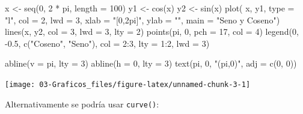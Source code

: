 \documentclass[
]{book}
\newenvironment{Shaded}{\begin{snugshade}}{\end{snugshade}}
\newcommand{\AttributeTok}[1]{\textcolor[rgb]{0.77,0.63,0.00}{#1}}
\newcommand{\DecValTok}[1]{\textcolor[rgb]{0.00,0.00,0.81}{#1}}
\newcommand{\FloatTok}[1]{\textcolor[rgb]{0.00,0.00,0.81}{#1}}
\newcommand{\FunctionTok}[1]{\textcolor[rgb]{0.00,0.00,0.00}{#1}}
\newcommand{\NormalTok}[1]{#1}
\newcommand{\OtherTok}[1]{\textcolor[rgb]{0.56,0.35,0.01}{#1}}
\newcommand{\SpecialCharTok}[1]{\textcolor[rgb]{0.00,0.00,0.00}{#1}}
\newcommand{\StringTok}[1]{\textcolor[rgb]{0.31,0.60,0.02}{#1}}
\theoremstyle{break}
\theoremstyle{nonumberplain}
\begin{document}
\begin{Shaded}
\begin{Highlighting}[]
\NormalTok{x }\OtherTok{\textless{}{-}} \FunctionTok{seq}\NormalTok{(}\DecValTok{0}\NormalTok{, }\DecValTok{2} \SpecialCharTok{*}\NormalTok{ pi, }\AttributeTok{length =} \DecValTok{100}\NormalTok{)}
\NormalTok{y1 }\OtherTok{\textless{}{-}} \FunctionTok{cos}\NormalTok{(x)}
\NormalTok{y2 }\OtherTok{\textless{}{-}} \FunctionTok{sin}\NormalTok{(x)}
\FunctionTok{plot}\NormalTok{( x, y1, }\AttributeTok{type =} \StringTok{"l"}\NormalTok{, }\AttributeTok{col =} \DecValTok{2}\NormalTok{, }\AttributeTok{lwd =} \DecValTok{3}\NormalTok{, }\AttributeTok{xlab =} \StringTok{"[0,2pi]"}\NormalTok{, }\AttributeTok{ylab =} \StringTok{""}\NormalTok{, }\AttributeTok{main =} \StringTok{"Seno y Coseno"}\NormalTok{)}
\FunctionTok{lines}\NormalTok{(x, y2, }\AttributeTok{col =} \DecValTok{3}\NormalTok{, }\AttributeTok{lwd =} \DecValTok{3}\NormalTok{, }\AttributeTok{lty =} \DecValTok{2}\NormalTok{)}
\FunctionTok{points}\NormalTok{(pi, }\DecValTok{0}\NormalTok{, }\AttributeTok{pch =} \DecValTok{17}\NormalTok{, }\AttributeTok{col =} \DecValTok{4}\NormalTok{)}
\FunctionTok{legend}\NormalTok{(}\DecValTok{0}\NormalTok{, }\SpecialCharTok{{-}}\FloatTok{0.5}\NormalTok{, }\FunctionTok{c}\NormalTok{(}\StringTok{"Coseno"}\NormalTok{, }\StringTok{"Seno"}\NormalTok{), }\AttributeTok{col =} \DecValTok{2}\SpecialCharTok{:}\DecValTok{3}\NormalTok{, }\AttributeTok{lty =} \DecValTok{1}\SpecialCharTok{:}\DecValTok{2}\NormalTok{, }\AttributeTok{lwd =} \DecValTok{3}\NormalTok{)}

\FunctionTok{abline}\NormalTok{(}\AttributeTok{v =}\NormalTok{ pi, }\AttributeTok{lty =} \DecValTok{3}\NormalTok{)}
\FunctionTok{abline}\NormalTok{(}\AttributeTok{h =} \DecValTok{0}\NormalTok{, }\AttributeTok{lty =} \DecValTok{3}\NormalTok{)}
\FunctionTok{text}\NormalTok{(pi, }\DecValTok{0}\NormalTok{, }\StringTok{"(pi,0)"}\NormalTok{, }\AttributeTok{adj =} \FunctionTok{c}\NormalTok{(}\DecValTok{0}\NormalTok{, }\DecValTok{0}\NormalTok{))}
\end{Highlighting}
\end{Shaded}

\begin{center}\texttt{[image: 03-Graficos\_files/figure-latex/unnamed-chunk-3-1]} \end{center}

Alternativamente se podría usar \texttt{curve()}:
\end{document}
